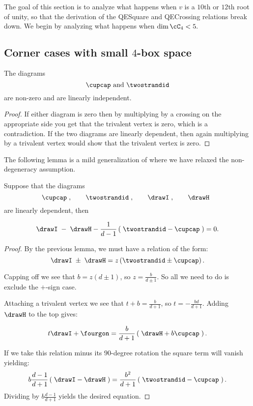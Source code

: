 \documentclass[12pt]{amsart}
\begin{document}
The goal of this section is to analyze what happens when $v$ is a $10$th or $12$th root of unity, so that the derivation of the QESquare and QECrossing relations break down.  We begin by analyzing what happens when $\dim \cC_4 < 5.$

\subsection{Corner cases with small $4$-box space}

\begin{lemma}
The diagrams
$$\cupcap \text{ and } \twostrandid$$
are non-zero and are linearly independent.
\end{lemma}
\begin{proof}
If either diagram is zero then by multiplying by a crossing on the appropriate side you get that the trivalent vertex is zero, which is a contradiction.  If the two diagrams are linearly dependent, then again multiplying by a trivalent vertex would show that the trivalent vertex is zero.
\end{proof}


The following lemma is a mild generalization of where we have relaxed the non-degeneracy assumption.


\begin{lemma}
Suppose that the diagrams   
  \[
  \cupcap\;,\qquad\twostrandid\;,
    \qquad\drawI\;,\qquad\drawH\;\;
   \]
are linearly dependent, then
 
$$\drawI\; - \; \drawH - \frac{1}{d-1} \left(\; \twostrandid - \cupcap \; \right) = 0.$$
\end{lemma}
\begin{proof}
By the previous lemma, we must have a relation of the form:
$$\drawI\;\pm \; \drawH = z \left(\twostrandid \pm \cupcap \right).$$

Capping off we see that $b= z (d \pm 1)$, so $z = \frac{b}{d \pm 1}$.  So all we need to do is exclude the $+$-sign case.

Attaching a trivalent vertex we see that $t + b = \frac{b}{d + 1}$, so $t =  -\frac{b d}{d + 1}$.  Adding $\drawH$ to the top gives:

$$t \drawI + \fourgon = \frac{b}{d+1} \left(\; \drawH + b \cupcap \; \right).$$

If we take this relation minus its $90$-degree rotation the square term will vanish yielding:
$$ b \frac{d-1}{d+1} \left(\; \drawI -\drawH \; \right) = \frac{b^2}{d+1} \left(\; \twostrandid - \cupcap \; \right).$$
Dividing by $b \frac{d-1}{d+1}$ yields the desired equation.
\end{proof}
\end{document}
